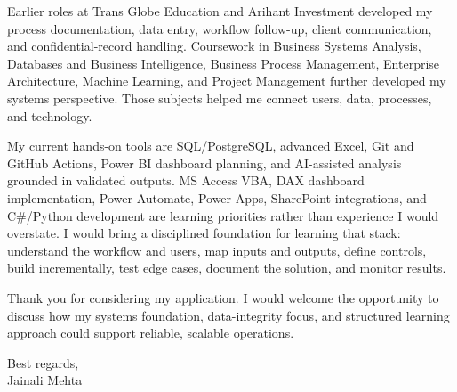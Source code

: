 \documentclass[letterpaper,11pt]{article}
\begin{document}
\bigbreak
Earlier roles at Trans Globe Education and Arihant Investment developed my process documentation, data entry, workflow follow-up, client communication, and confidential-record handling. Coursework in Business Systems Analysis, Databases and Business Intelligence, Business Process Management, Enterprise Architecture, Machine Learning, and Project Management further developed my systems perspective. Those subjects helped me connect users, data, processes, and technology.

\bigbreak
My current hands-on tools are SQL/PostgreSQL, advanced Excel, Git and GitHub Actions, Power BI dashboard planning, and AI-assisted analysis grounded in validated outputs. MS Access VBA, DAX dashboard implementation, Power Automate, Power Apps, SharePoint integrations, and C\#/Python development are learning priorities rather than experience I would overstate. I would bring a disciplined foundation for learning that stack: understand the workflow and users, map inputs and outputs, define controls, build incrementally, test edge cases, document the solution, and monitor results.

\bigbreak
Thank you for considering my application. I would welcome the opportunity to discuss how my systems foundation, data-integrity focus, and structured learning approach could support reliable, scalable operations.

\bigbreak
Best regards,\\
Jainali Mehta
\end{document}
